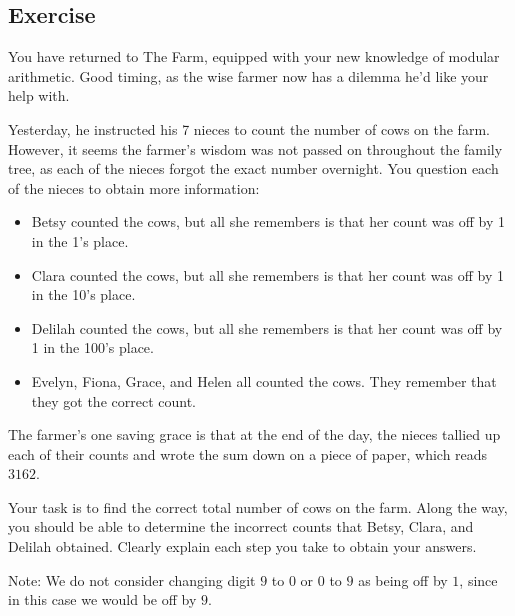 \documentclass{article}
\newcounter{counter}
\newcommand{\Exercise}{Exercise \stepcounter{counter}\thecounter}
\begin{document}
\subsection*{\Exercise}
    You have returned to The Farm, equipped with your new knowledge of modular arithmetic. Good timing, as the wise farmer now has a dilemma he'd like your help with. 
    
    \hspace{15pt} Yesterday, he instructed his 7 nieces to count the number of cows on the farm. However, it seems the farmer's wisdom was not passed on throughout the family tree, as each of the nieces forgot the exact number overnight. You question each of the nieces to obtain more information:
    \begin{itemize}
        \item Betsy counted the cows, but all she remembers is that her count was off by 1 in the 1’s place. 
        \item Clara counted the cows, but all she remembers is that her count was off by 1 in the 10’s place.
        \item Delilah counted the cows, but all she remembers is that her count was off by 1 in the 100’s place. 
        \item Evelyn, Fiona, Grace, and Helen all counted the cows. They remember that they got the correct count.
    \end{itemize}
    The farmer's one saving grace is that at the end of the day, the nieces tallied up each of their counts and wrote the sum down on a piece of paper, which reads $3162$.
    
    \hspace{15pt} Your task is to find the correct total number of cows on the farm. Along the way, you should be able to determine the incorrect counts that Betsy, Clara, and Delilah obtained. Clearly explain each step you take to obtain your answers.
    
    \vspace{1.5mm} {\small Note: We do not consider changing digit $9$ to $0$ or $0$ to $9$ as being off by $1$, since in this case we would be off by $9$. }
\end{document}
